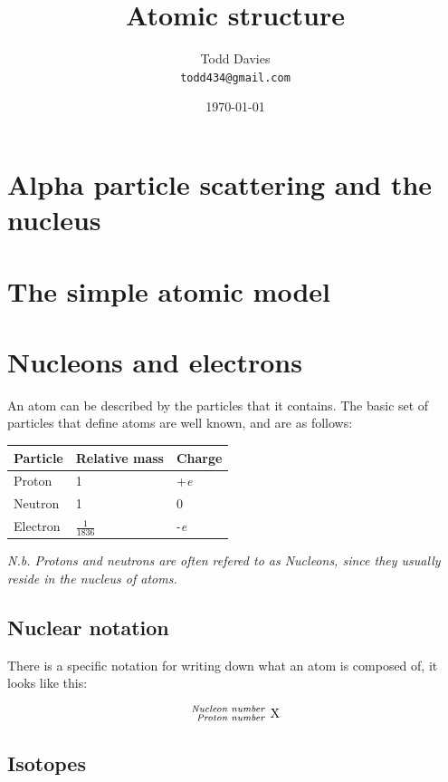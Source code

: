 \documentclass{article}
\title{Atomic structure}
\author{Todd Davies\\
	\texttt{\small todd434@gmail.com}}
\date{\today}
\begin{document}
\lhead{\today}

\maketitle

\section*{Alpha particle scattering and the nucleus}
\thispagestyle{empty}

\section*{The simple atomic model}

\section*{Nucleons and electrons}

An atom can be described by the particles that it contains. The basic set of
particles that define atoms are well known, and are as follows:

\begin{center}
\begin{tabular}{l|l|l}
	{\bf Particle} & {\bf Relative mass} & {\bf Charge} \\ \hline
	Proton & 1 & +{\it e}\\ \hline
	Neutron & 1 & 0\\ \hline
	Electron & $\frac{1}{1836}$ & -{\it e}
\end{tabular}
\end{center}

\textit{N.b. Protons and neutrons are often refered to as Nucleons, since they
usually reside in the nucleus of atoms.}

\subsection*{Nuclear notation}

There is a specific notation for writing down what an atom is composed of, it
looks like this:

\[
	\ce{^{\textrm{\it Nucleon number }}_{\textrm{\it Proton number }} X}
\]

\subsection*{Isotopes}
\end{document}

